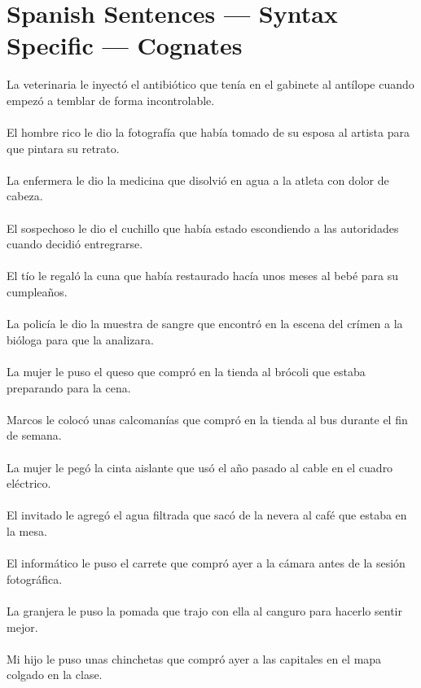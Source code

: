 \section{Spanish Sentences --- Syntax Specific --- Cognates}
La veterinaria le inyectó el antibiótico que tenía en el gabinete al antílope cuando empezó a temblar de forma incontrolable.	\\	\\
El hombre rico le dio la fotografía que había tomado de su esposa al artista para que pintara su retrato.	\\	\\
La enfermera le dio la medicina que disolvió en agua a la atleta con dolor de cabeza.	\\	\\
El sospechoso le dio el cuchillo que había estado escondiendo a las autoridades cuando decidió entregrarse.	\\	\\
El tío le regaló la cuna que había restaurado hacía unos meses al bebé para su cumpleaños.	\\	\\
La policía le dio la muestra de sangre que encontró en la escena del crímen a la bióloga para que la analizara.	\\	\\
La mujer le puso el queso que compró en la tienda al brócoli que estaba preparando para la cena.	\\	\\
Marcos le colocó unas calcomanías que compró en la tienda al bus durante el fin  de semana.	\\	\\
La mujer le pegó la cinta aislante que usó el año pasado al cable en el cuadro eléctrico.	\\	\\
El invitado le agregó el agua filtrada que sacó de la nevera al café que estaba en la mesa.	\\	\\
El informático le puso el carrete que compró ayer a la cámara antes de la sesión fotográfica.	\\	\\
La granjera le puso la pomada que trajo con ella al canguro para hacerlo sentir mejor.	\\	\\
Mi hijo le puso unas chinchetas que compró ayer a las capitales en el mapa colgado en la clase.	\\	\\
